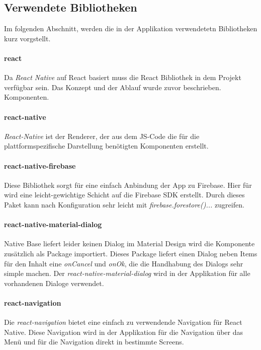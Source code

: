 \subsection{Verwendete Bibliotheken}
Im folgenden Abschnitt, werden die in der Applikation verwendetetn Bibliotheken kurz vorgstellt.

\paragraph{react}
Da \textit{React Native} auf React basiert muss die React Bibliothek
in dem Projekt verfügbar sein. Das Konzept und der Ablauf wurde zuvor beschrieben.
Komponenten. \cite{React:online}

\paragraph{react-native}
\textit{React-Native} ist der Renderer, der aus dem JS-Code
die für die plattformspezifische Darstellung benötigten Komponenten erstellt.
\cite{ReactNative:online}

\paragraph{react-native-firebase}
Diese Bibliothek sorgt für eine einfach Anbindung der App zu Firebase. Hier für wird eine leicht-gewichtige
Schicht auf die Firebase SDK erstellt. Durch dieses Paket kann nach Konfiguration sehr leicht mit \textit{firebase.forestore()...}
zugreifen.
\cite{invertas78:online}

\paragraph{react-native-material-dialog}
Native Base liefert leider keinen Dialog im Material Design wird die Komponente zusätzlich als Package
importiert. Dieses Package liefert einen Dialog neben Items für den Inhalt eine \textit{onCancel} und
\textit{onOk},  die die Handhabung des Dialogs sehr simple machen. Der \textit{react-native-material-dialog}
wird in der Applikation für alle vorhandenen Dialoge verwendet.
\cite{MaterialDialog:online}

\paragraph{react-navigation}
Die \textit{react-navigation} bietet eine einfach zu verwendende Navigation für React Native.
Diese Navigation wird in der Applikation für die Navigation über das Menü und für die Navigation
direkt in bestimmte Screens. \cite{ReactNavigation:online}

